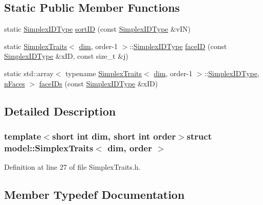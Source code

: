 \subsection*{Static Public Member Functions}
\begin{DoxyCompactItemize}
\item 
static \hyperlink{structmodel_1_1_simplex_traits_aea38aba3da1babde2d5f0c62f7862eae}{Simplex\+I\+D\+Type} \hyperlink{structmodel_1_1_simplex_traits_a3a935ebea43fc2785a95bb46acb56a00}{sort\+I\+D} (const \hyperlink{structmodel_1_1_simplex_traits_aea38aba3da1babde2d5f0c62f7862eae}{Simplex\+I\+D\+Type} \&v\+I\+N)
\item 
static \hyperlink{structmodel_1_1_simplex_traits}{Simplex\+Traits}$<$ \hyperlink{plot_nd_a_8m_a382f3ca768b275b8d563604f7fc7df73}{dim}, order-\/1 $>$\+::\hyperlink{structmodel_1_1_simplex_traits_aea38aba3da1babde2d5f0c62f7862eae}{Simplex\+I\+D\+Type} \hyperlink{structmodel_1_1_simplex_traits_a674908eea645453eb8938081b9de0c7b}{face\+I\+D} (const \hyperlink{structmodel_1_1_simplex_traits_aea38aba3da1babde2d5f0c62f7862eae}{Simplex\+I\+D\+Type} \&x\+I\+D, const size\+\_\+t \&j)
\item 
static std\+::array$<$ typename \hyperlink{structmodel_1_1_simplex_traits}{Simplex\+Traits}$<$ \hyperlink{plot_nd_a_8m_a382f3ca768b275b8d563604f7fc7df73}{dim}, order-\/1 $>$\+::\hyperlink{structmodel_1_1_simplex_traits_aea38aba3da1babde2d5f0c62f7862eae}{Simplex\+I\+D\+Type}, \hyperlink{structmodel_1_1_simplex_traits_a0541ec22e17956e27bc75269ef60572aa19cf4b3aa42d86206e9999725cb5b1ee}{n\+Faces} $>$ \hyperlink{structmodel_1_1_simplex_traits_a8f2a4d724069b1db5538e183508dd003}{face\+I\+Ds} (const \hyperlink{structmodel_1_1_simplex_traits_aea38aba3da1babde2d5f0c62f7862eae}{Simplex\+I\+D\+Type} \&x\+I\+D)
\end{DoxyCompactItemize}


\subsection{Detailed Description}
\subsubsection*{template$<$short int dim, short int order$>$struct model\+::\+Simplex\+Traits$<$ dim, order $>$}



Definition at line 27 of file Simplex\+Traits.\+h.



\subsection{Member Typedef Documentation}
\hypertarget{structmodel_1_1_simplex_traits_a57cfde9abd77073f1512baf404bbb328}{}
